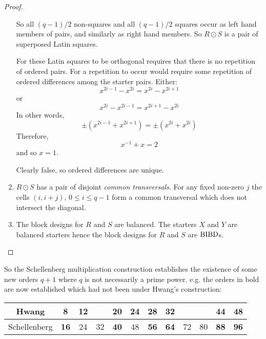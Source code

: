 \begin{proof}
\begin{enumerate}
{      So all $(q - 1)/2$ non-squares and all $(q - 1)/2$
      squares occur as left hand members of pairs, and
      similarly as right hand members. So $R \odot S$ is a
      pair of superposed Latin squares.
      
      For these Latin
      squares to be orthogonal requires that there is no
      repetition of ordered pairs.  For a repetition to
      occur would require some repetition of ordered
      differences among the starter pairs.  Either:
      \begin{equation}
        x^{2i - 1} - x^{2i} = x^{2i} - x^{2i + 1}
      \end{equation}
      or
      \begin{equation}
        x^{2i} - x^{2i-1} = x^{2i+1} - x^{2i}
      \end{equation}
      In other words,
      \begin{equation}
       \pm (x^{2i - 1} + x^{2i + 1}) = \pm (x^{2i} + x^{2i})
      \end{equation}
      Therefore,
      \begin{equation}
        x^{-1} + x = 2
      \end{equation}
      and so $x = 1$.

      Clearly false, so ordered differences are unique.}
  \item{$R \odot S$ has a pair of disjoint \emph{common transversals}.
      For any fixed non-zero $j$ the cells
      $(i, i + j)$, $0 \leq i \leq q - 1$ form a common
      transversal which does not intersect the diagonal.}
  \item{The block designs for $R$ and $S$ are balanced. The
      starters $X$ and $Y$ are balanced starters hence the
      block designs for $R$ and $S$ are $\operatorname{BIBD}$s.}
  \end{enumerate}
\end{proof}

So the Schellenberg multiplication construction establishes the existence of some new orders $q + 1$ where $q$ is not necessarily a prime power. e.g. the orders in bold are now established which had not been under Hwang’s construction:

\begin{center}
  \begin{tabular}{|c|c|c|c|c|c|c|c|c|c|c|c|}
  \hline
     Hwang     &  8 & 12 &    & 20 & 24 & 28 & 32 &    &    & 44 & 48 \\ \hline
  Schellenberg & \textbf{16} & 24 & 32 & \textbf{40} & 48 & \textbf{56} & \textbf{64} & 72 & 80 & \textbf{88} & \textbf{96} \\ \hline
  \end{tabular}
\end{center}

